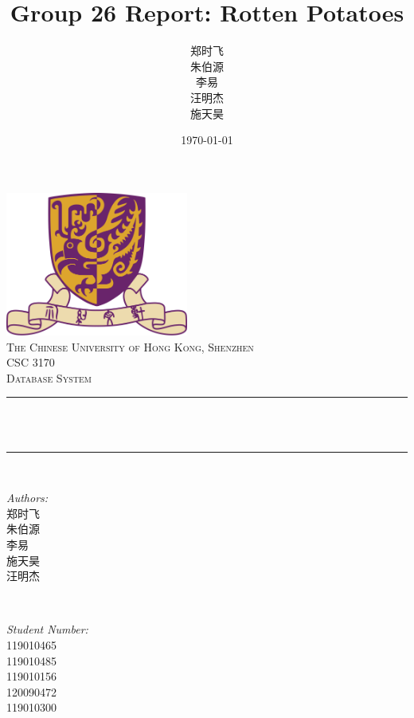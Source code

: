 \title{Group 26 Report: Rotten Potatoes} %
\author{郑时飞 \\ 朱伯源 \\ 李易 \\ 汪明杰 \\ 施天昊}%
\date{\today}%



\usepackage{graphicx, bm}
\graphicspath{{graphics/}}
\usepackage{geometry}
\geometry{left=5cm,top=5cm,right=0cm,bottom=0cm}

\usepackage[colorlinks,linkcolor=blue]{hyperref}


\begin{CJK*}{UTF8}{gbsn}

\begin{titlepage}
    \centering
    \vspace*{0.5 cm}
    \includegraphics[scale = 0.75,width=6cm]{CUHK}\\[1.0 cm]
    \textsc{\large The Chinese University of Hong Kong, Shenzhen}\\[1.5 cm] 
    \textsc{\Large CSC 3170}\\[0.5 cm] 
    \textsc{\large Database System}\\[0.5 cm]
    \rule{\linewidth}{0.2 mm} \\[0.4 cm]
    { \huge \bfseries \thetitle}\\
    \rule{\linewidth}{0.2 mm} \\[0.6 cm]
    
    \begin{minipage}{0.4\textwidth}
        \begin{flushleft} \large
            \emph{Authors:}\\
            郑时飞 \\ 朱伯源 \\ 李易 \\ 施天昊 \\ 汪明杰
            \end{flushleft}
    \end{minipage}~
    \begin{minipage}{0.4\textwidth}
            \begin{flushright} \large
            \emph{Student Number:} \\
            119010465 \\ 119010485 \\ 119010156 \\ 120090472 \\ 119010300
        \end{flushright}
    \end{minipage}\\[2 cm]
    {\large \thedate}\\[2 cm]
 

\end{titlepage}
\end{CJK*}
